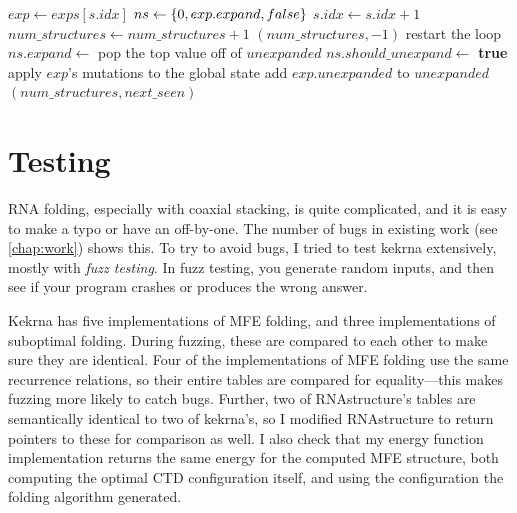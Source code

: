 \documentclass{cshonours}
\DeclarePairedDelimiter{\br}{\{}{\}}
\newcommand{\NOT}{\neg}
\begin{document}
\begin{algorithm}
\begin{algorithmic}
\State $exp \gets exps[s.idx]$ 
\State $ns \gets \br{0, exp.expand, false}$ 
\State $s.idx \gets s.idx + 1$
 
 
\If{$\NOT exact\_energy$ \textbf{or} $energy = delta$}
\State {}
\State $num\_structures \gets num\_structures + 1$
\State \Return $(num\_structures, -1)$
\EndIf
\EndIf
\State restart the loop
\Else {}
\State $ns.expand \gets $ pop the top value off of $unexpanded$
\State $ns.should\_unexpand \gets$ \textbf{true} 
\EndIf
\Else
\State apply $exp$'s mutations to the global state
\State add $exp.unexpanded$ to $unexpanded$
\EndIf
\EndIf
\EndWhile
\State \Return $(num\_structures, next\_seen)$
\EndFunction
\end{algorithmic}
\end{algorithm}

\section{Testing}
\label{sec:testing}
RNA folding, especially with coaxial stacking, is quite complicated, and it is easy to make a typo or have an off-by-one. The number of bugs in existing work (see \autoref{chap:work}) shows this. To try to avoid bugs, I tried to test kekrna extensively, mostly with \emph{fuzz testing}. In fuzz testing, you generate random inputs, and then see if your program crashes or produces the wrong answer. 

Kekrna has five implementations of MFE folding, and three implementations of suboptimal folding. During fuzzing, these are compared to each other to make sure they are identical. Four of the implementations of MFE folding use the same recurrence relations, so their entire tables are compared for equality---this makes fuzzing more likely to catch bugs. Further, two of RNAstructure's tables are semantically identical to two of kekrna's, so I modified RNAstructure to return pointers to these for comparison as well. I also check that my energy function implementation returns the same energy for the computed MFE structure, both computing the optimal CTD configuration itself, and using the configuration the folding algorithm generated.
\end{document}
